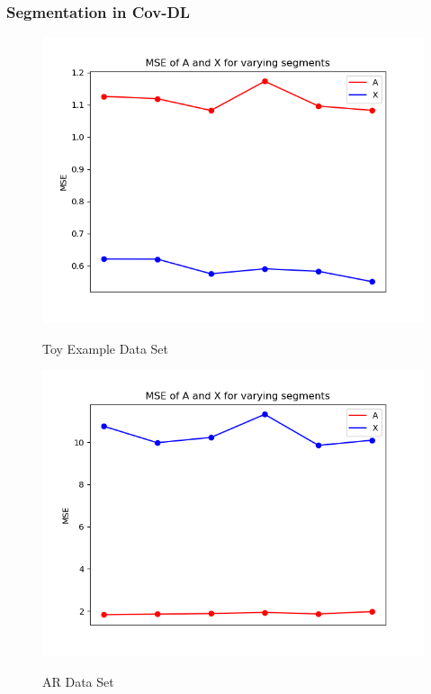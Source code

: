 \subsubsection{Segmentation in Cov-DL}
\begin{figure}[H]
\centering
    \begin{minipage}[t]{.45\textwidth}
        \centering
\includegraphics[scale=0.5]{figures/chapter6/Mix_Error_vary_covseg_m8_k16_L1000.png}
\label{fig:seg_mix}
\caption{Toy Example Data Set}
    \end{minipage} 
    \hfill
    \begin{minipage}[t]{.45\textwidth}
        \centering
\includegraphics[scale=0.5]{figures/chapter6/AR_Error_vary_covseg_m8_k16_L1000.png}
\label{fig:seg_AR}
\caption{AR Data Set}
    \end{minipage}
\end{figure}
\noindent



